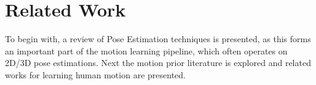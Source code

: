 \setcounter{chapter}{1}

\chapter{Related Work}

To begin with, a review of Pose Estimation techniques is presented, as this forms an important part of the motion learning pipeline, which often operates on 2D/3D pose estimations. Next the motion prior literature is explored and related works for learning human motion are presented.




